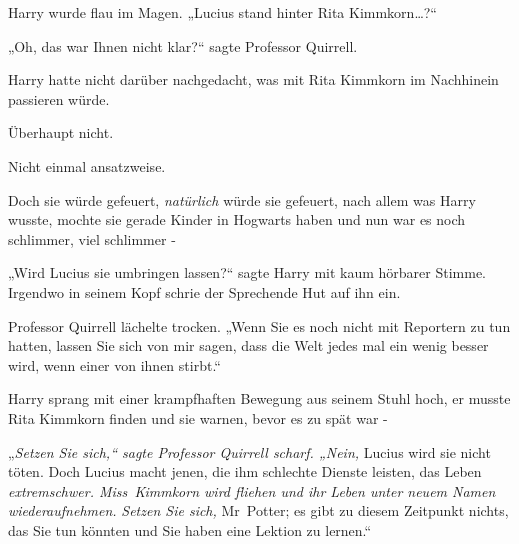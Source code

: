 Harry wurde flau im Magen. „Lucius stand hinter Rita Kimmkorn…?“

„Oh, das war Ihnen nicht klar?“ sagte Professor Quirrell.

Harry hatte nicht darüber nachgedacht, was mit Rita Kimmkorn im Nachhinein passieren würde.

Überhaupt nicht.

Nicht einmal ansatzweise.

Doch sie würde gefeuert, \emph{natürlich} würde sie gefeuert, nach allem was Harry wusste, mochte sie gerade Kinder in Hogwarts haben und nun war es noch schlimmer, viel schlimmer -

„Wird Lucius sie umbringen lassen?“ sagte Harry mit kaum hörbarer Stimme. Irgendwo in seinem Kopf schrie der Sprechende Hut auf ihn ein.

Professor Quirrell lächelte trocken. „Wenn Sie es noch nicht mit Reportern zu tun hatten, lassen Sie sich von mir sagen, dass die Welt jedes mal ein wenig besser wird, wenn einer von ihnen stirbt.“

Harry sprang mit einer krampfhaften Bewegung aus seinem Stuhl hoch, er musste Rita Kimmkorn finden und sie warnen, bevor es zu spät war -

„\emph{Setzen Sie sich,“ sagte Professor Quirrell scharf. „Nein,} Lucius wird sie nicht töten. Doch Lucius macht jenen, die ihm schlechte Dienste leisten, das Leben \emph{extremschwer. Miss~Kimmkorn wird fliehen und ihr Leben unter neuem Namen wiederaufnehmen.} \emph{Setzen Sie sich,} Mr~Potter; es gibt zu diesem Zeitpunkt nichts, das Sie tun könnten und Sie haben eine Lektion zu lernen.“

